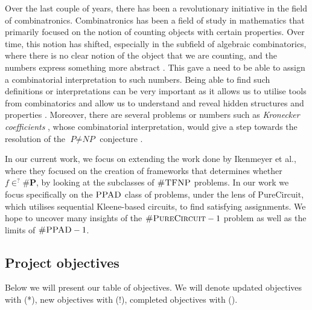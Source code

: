 Over the last couple of years, there has been a revolutionary
initiative in the field of combinatronics.
Combinatronics has been a field of study in mathematics that primarily focused on
the notion of counting objects with certain properties. Over time, this notion
has shifted, especially in the subfield of algebraic combinatorics, where
there is no clear notion of the object that we are counting,
and the numbers express something more abstract \cite{pak_WhatCombinatorialInterpretation_2022}.
This gave a need to be able to assign a combinatorial interpretation to such numbers.
Being able to find such definitions or interpretations can be very important
as it allows us to utilise tools from combinatorics and allow us to understand
and reveal hidden structures and properties \cite{pak_WhatCombinatorialInterpretation_2022}. 
Moreover, there are several problems or numbers such as \textit{Kronecker coefficients} \cite{makar_AnalysisKroneckerProduct_1949},
whose combinatorial interpretation, would give a step towards the resolution of the $\textit{P} \neq \textit{NP}$
conjecture \cite{ikenmeyer_WhatWhatNot_2022, ikenmeyer_VanishingKroneckerCoefficients_2017}.


In our current work, we focus on extending the work done by
Ikenmeyer et al., where they focused on the creation of frameworks
that determines whether $f \in^? \textbf{\#P}$, by looking
at the subclasses of $\textsc{\#TFNP}$ problems.
In our work we focus specifically on the $\textsc{PPAD}$ class of problems, under the lens of $\text{PureCircuit}$,
which utilises sequential Kleene-based circuits, to find satisfying assignments.
We hope to uncover many insights of the $\textsc{\#PureCircuit} -1$ problem 
as well as the limits of $\textsc{\#PPAD} -1$.



\subsection{Project objectives}

Below we will present our table of objectives. We will denote updated objectives with
(*), new objectives with (!), completed objectives with (\checkmark).

